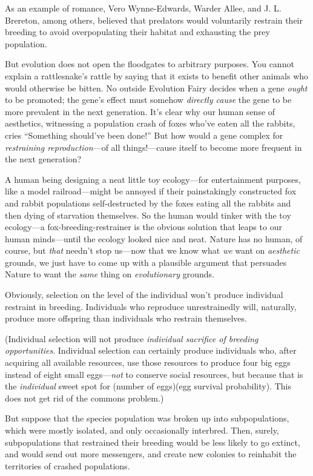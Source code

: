 {
 As an example of romance, Vero Wynne-Edwards, Warder Allee, and J.
L. Brereton, among others, believed that predators would voluntarily
restrain their breeding to avoid overpopulating their habitat and
exhausting the prey population.}

{
 But evolution does not open the floodgates to arbitrary purposes.
You cannot explain a rattlesnake's rattle by saying
that it exists to benefit other animals who would otherwise be bitten.
No outside Evolution Fairy decides when a gene \textit{ought} to be
promoted; the gene's effect must somehow
\textit{directly cause} the gene to be more prevalent in the next
generation. It's clear why our human sense of
aesthetics, witnessing a population crash of foxes
who've eaten all the rabbits, cries
``Something should've been
done!'' But how would a gene complex for
\textit{restraining reproduction}{}---of all things!---cause itself to
become more frequent in the next generation?}

{
 A human being designing a neat little toy ecology---for
entertainment purposes, like a model railroad---might be annoyed if
their painstakingly constructed fox and rabbit populations
self-destructed by the foxes eating all the rabbits and then dying of
starvation themselves. So the human would tinker with the toy
ecology---a fox-breeding-restrainer is the obvious solution that leaps
to our human minds---until the ecology looked nice and neat. Nature has
no human, of course, but \textit{that} needn't stop
us---now that we know what \textit{we} want on \textit{aesthetic}
grounds, we just have to come up with a plausible argument that
persuades Nature to want the \textit{same} thing on
\textit{evolutionary} grounds.}

{
 Obviously, selection on the level of the individual
won't produce individual restraint in breeding.
Individuals who reproduce unrestrainedly will, naturally, produce more
offspring than individuals who restrain themselves.}

{
 (Individual selection will not produce \textit{individual
sacrifice of breeding opportunities}. Individual selection can
certainly produce individuals who, after acquiring all available
resources, use those resources to produce four big eggs instead of
eight small eggs---\textit{not} to conserve social resources, but
because that is the \textit{individual} sweet spot for (number of
eggs){\texttimes}(egg survival probability). This does not get rid of
the commons problem.)}

{
 But suppose that the species population was broken up into
subpopulations, which were mostly isolated, and only occasionally
interbred. Then, surely, subpopulations that restrained their breeding
would be less likely to go extinct, and would send out more messengers,
and create new colonies to reinhabit the territories of crashed
populations.}

